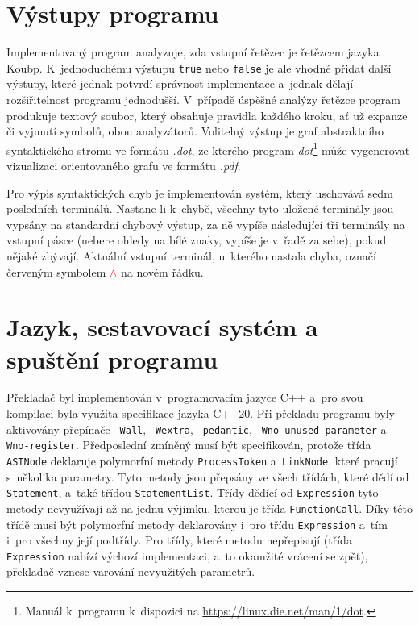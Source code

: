 \section{Výstupy programu}
Implementovaný program analyzuje, zda vstupní řetězec je řetězcem jazyka Koubp.
K~jednoduchému výstupu \texttt{true} nebo \texttt{false} je ale vhodné přidat další výstupy, které jednak potvrdí správnost implementace a~jednak dělají rozšiřitelnost programu jednodušší.
V~případě úspěšné analýzy řetězce program produkuje textový soubor, který obsahuje pravidla každého kroku, ať už expanze či vyjmutí symbolů, obou analyzátorů.
Volitelný výstup je graf abstraktního syntaktického stromu ve formátu \emph{.dot}, ze kterého program \emph{dot}\footnote{Manuál k~programu k~dispozici na \href{https://linux.die.net/man/1/dot}{https://linux.die.net/man/1/dot}.} může vygenerovat vizualizaci orientovaného grafu ve formátu \emph{.pdf}.

Pro výpis syntaktických chyb je implementován systém, který uschovává sedm posledních terminálů.
Nastane-li k~chybě, všechny tyto uložené terminály jsou vypsány na standardní chybový výstup, za ně vypíše následující tři terminály na vstupní pásce (nebere ohledy na bílé znaky, vypíše je v~řadě za sebe), pokud nějaké zbývají.
Aktuální vstupní terminál, u~kterého nastala chyba, označí červeným symbolem \textcolor{red}{$\wedge$} na novém řádku.

\section{Jazyk, sestavovací systém a spuštění programu}
Překladač byl implementován v~programovacím jazyce C++ a~pro svou kompilaci byla využita specifikace jazyka C++20. Při překladu programu byly aktivovány přepínače \texttt{-Wall}, \texttt{-Wextra}, \texttt{-pedantic}, \texttt{-Wno-unused-parameter} a~\texttt{-Wno-register}.
Předposlední zmíněný musí být specifikován, protože třída \texttt{ASTNode} deklaruje polymorfní metody \texttt{ProcessToken} a~\texttt{LinkNode}, které pracují s~několika parametry.
Tyto metody jsou přepsány ve všech třídách, které dědí od \texttt{Statement}, a~také třídou  \texttt{StatementList}.
Třídy dědící od \texttt{Expression} tyto metody nevyužívají až na jednu výjimku, kterou je třída \texttt{FunctionCall}.
Díky této třídě musí být polymorfní metody deklarovány i~pro třídu \texttt{Expression} a~tím i~pro všechny její podtřídy.
Pro třídy, které metodu nepřepisují (třída \texttt{Expression} nabízí výchozí implementaci, a~to okamžité vrácení se zpět), překladač vznese varování nevyužitých parametrů.

